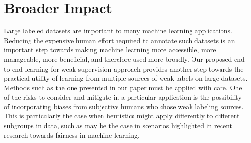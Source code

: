 \documentclass{article}
\begin{document}
\section{Broader Impact} 
\label{sec:broaderImpact}
Large labeled datasets are important to many machine learning applications. 
Reducing the expensive human effort required to annotate such datasets is an important step towards making machine learning more accessible, more manageable, more beneficial, and therefore used more broadly. 
Our proposed end-to-end learning for weak supervision approach provides another step towards the practical utility of learning from multiple sources of weak labels on large datasets.
Methods such as the one presented in our paper must be applied with care. 
One of the risks to consider and mitigate in a particular application is the possibility of incorporating biases from subjective humans who chose weak labeling sources. This is particularly the case when heuristics might apply differently to different subgroups in data, such as may be the case in scenarios highlighted in recent research towards fairness in machine learning.
 
\end{document}
